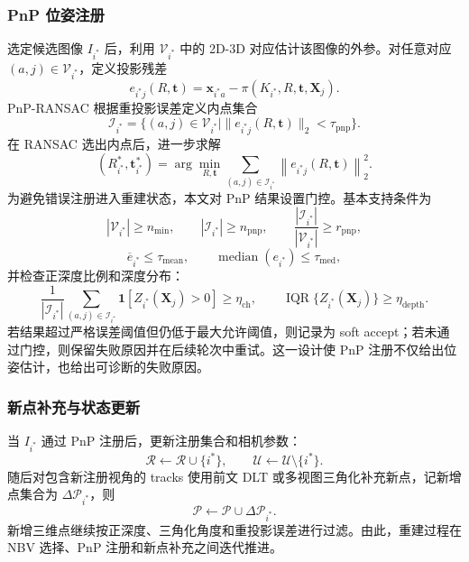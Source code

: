 \documentclass[lang=cn,a4paper,newtx]{elegantpaper} %
\begin{document}
\subsubsection{PnP 位姿注册}
选定候选图像 $I_{i^{*}}$ 后，利用 $\mathcal{V}_{i^{*}}$ 中的 2D-3D 对应估计该图像的外参。对任意对应 $(a,j)\in\mathcal{V}_{i^{*}}$，定义投影残差
\begin{equation}
    e_{i^{*}j}(R,\mathbf{t})
    =
    \mathbf{x}_{i^{*}a}
    -\pi(K_{i^{*}},R,\mathbf{t},\mathbf{X}_j).
\end{equation}
PnP-RANSAC 根据重投影误差定义内点集合
\begin{equation}
    \mathcal{I}_{i^{*}}
    =
    \{(a,j)\in\mathcal{V}_{i^{*}}
    \mid
    \|e_{i^{*}j}(R,\mathbf{t})\|_2<\tau_{\mathrm{pnp}}\}.
\end{equation}
在 RANSAC 选出内点后，进一步求解
\begin{equation}
    (R_{i^{*}}^{*},\mathbf{t}_{i^{*}}^{*})
    =
    \arg\min_{R,\mathbf{t}}
    \sum_{(a,j)\in\mathcal{I}_{i^{*}}}
    \left\|
    e_{i^{*}j}(R,\mathbf{t})
    \right\|_2^2 .
\end{equation}
为避免错误注册进入重建状态，本文对 PnP 结果设置门控。基本支持条件为
\begin{equation}
    |\mathcal{V}_{i^{*}}|\ge n_{\min},
    \qquad
    |\mathcal{I}_{i^{*}}|\ge n_{\mathrm{pnp}},
    \qquad
    \frac{|\mathcal{I}_{i^{*}}|}{|\mathcal{V}_{i^{*}}|}
    \ge r_{\mathrm{pnp}} ,
\end{equation}
\begin{equation}
    \overline{e}_{i^{*}}\le \tau_{\mathrm{mean}},
    \qquad
    \operatorname{median}(e_{i^{*}})\le \tau_{\mathrm{med}},
\end{equation}
并检查正深度比例和深度分布：
\begin{equation}
    \frac{1}{|\mathcal{I}_{i^{*}}|}
    \sum_{(a,j)\in\mathcal{I}_{i^{*}}}
    \mathbf{1}[Z_{i^{*}}(\mathbf{X}_j)>0]
    \ge \eta_{\mathrm{ch}},
    \qquad
    \operatorname{IQR}\{Z_{i^{*}}(\mathbf{X}_j)\}\ge \eta_{\mathrm{depth}} .
\end{equation}
若结果超过严格误差阈值但仍低于最大允许阈值，则记录为 soft accept；若未通过门控，则保留失败原因并在后续轮次中重试。这一设计使 PnP 注册不仅给出位姿估计，也给出可诊断的失败原因。

\subsubsection{新点补充与状态更新}
当 $I_{i^{*}}$ 通过 PnP 注册后，更新注册集合和相机参数：
\begin{equation}
    \mathcal{R}\leftarrow\mathcal{R}\cup\{i^{*}\},
    \qquad
    \mathcal{U}\leftarrow\mathcal{U}\setminus\{i^{*}\}.
\end{equation}
随后对包含新注册视角的 tracks 使用前文 DLT 或多视图三角化补充新点，记新增点集合为 $\Delta\mathcal{P}_{i^{*}}$，则
\begin{equation}
    \mathcal{P}\leftarrow\mathcal{P}\cup\Delta\mathcal{P}_{i^{*}}.
\end{equation}
新增三维点继续按正深度、三角化角度和重投影误差进行过滤。由此，重建过程在 NBV 选择、PnP 注册和新点补充之间迭代推进。
\end{document}
